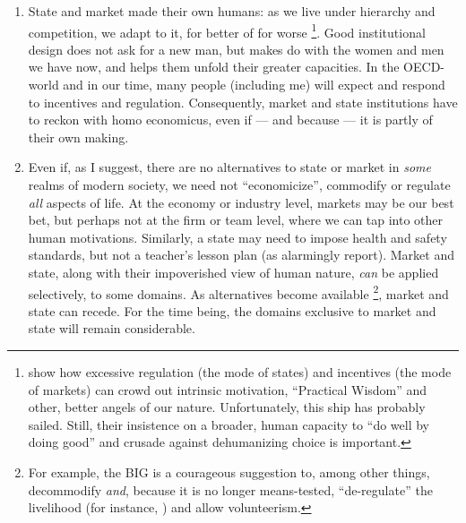 \documentclass[11pt,a4paper,oneside,openright]{article}
\begin{document}
\begin{enumerate}
\begin{enumerate}
		\item State and market made their own humans: 
		as we live under hierarchy and competition, we adapt to it, for better of for worse \citealt[e.g.][]{Schwartz2010}
			\footnote{
				\cite{Schwartz2010} show how excessive regulation (the mode of states) and incentives (the mode of markets) can crowd out intrinsic motivation, ``Practical Wisdom'' and other, better angels of our nature. 
				Unfortunately, this ship has probably sailed. Still, their insistence on a broader, human capacity to ``do well by doing good'' and crusade against dehumanizing choice is important.
			}. 
		Good institutional design does not ask for a new man, but makes do with the women and men we have now, and helps them unfold their greater capacities. 
		In the \gls{OECD}-world and in our time, many people (including me) will expect and respond to incentives and regulation. 
		Consequently, market and state institutions have to reckon with homo economicus, even if --- and because --- it is partly of their own making.
		
		\item Even if, as I suggest, there are no alternatives to state or market in \emph{some} realms of modern society, we need not ``economicize'', commodify or regulate \emph{all} aspects of life. 
		At the economy or industry level, markets may be our best bet, but perhaps not at the firm or team level, where we can tap into other human motivations. 
		Similarly, a state may need to impose health and safety standards, but not a teacher's lesson plan (as \citeauthor{Schwartz2010} alarmingly report). 
		Market and state, along with their impoverished view of human nature, \emph{can} be applied selectively, to some domains. 
		As alternatives become available
			\footnote{
				For example, the \gls{BIG} is a courageous suggestion to, among other things, decommodify \emph{and}, because it is no longer means-tested, ``de-regulate'' the livelihood (for instance, \citealt{Offe2009}) and allow volunteerism.
			}, 
		market and state can recede. 
		For the time being, the domains exclusive to market and state will remain considerable. 
		

\end{enumerate}
\end{enumerate}
\end{document}
